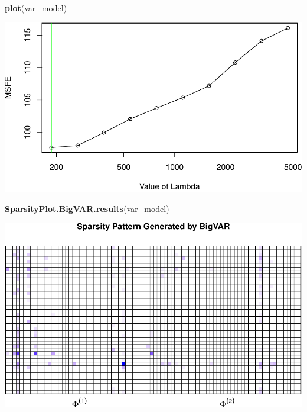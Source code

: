 \documentclass[]{article}
\newenvironment{Shaded}{\begin{snugshade}}{\end{snugshade}}
\newcommand{\KeywordTok}[1]{\textcolor[rgb]{0.13,0.29,0.53}{\textbf{#1}}}
\newcommand{\NormalTok}[1]{#1}
\begin{document}
\begin{Shaded}
\begin{Highlighting}[]
\KeywordTok{plot}\NormalTok{(var_model)}
\end{Highlighting}
\end{Shaded}

\includegraphics{VAR_files/figure-latex/unnamed-chunk-11-1.pdf}

\begin{Shaded}
\begin{Highlighting}[]
\KeywordTok{SparsityPlot.BigVAR.results}\NormalTok{(var_model)}
\end{Highlighting}
\end{Shaded}

\includegraphics{VAR_files/figure-latex/unnamed-chunk-12-1.pdf}
\end{document}
